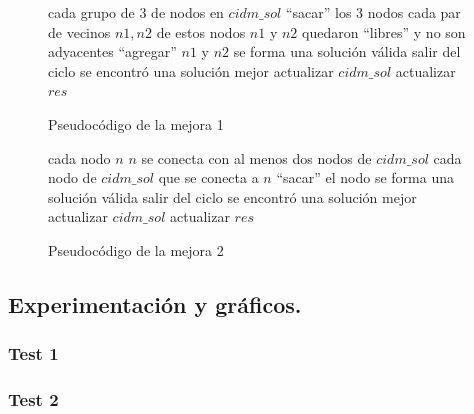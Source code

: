 \begin{figure}
\begin{codebox}
\li \For cada grupo de 3 de nodos en $cidm\_sol$
\li \Do 
		``sacar'' los 3 nodos
\li 		\For cada par de vecinos $n1,n2$ de estos nodos
\li 		\Do 
			\If $n1$ y $n2$ quedaron ``libres'' y no son adyacentes
\li			\Then
				``agregar'' $n1$ y $n2$
\li 				\If se forma una solución válida
\li 				\Then salir del ciclo
				\End
			\End
		\End
\li 		\If se encontró una solución mejor
\li 		\Then
			actualizar $cidm\_sol$
\li 			actualizar $res$
\li 			\Return
		\End
	\End
\li \Return
\end{codebox}
\caption{Pseudocódigo de la mejora 1}\label{code:mej1}
\end{figure}



\begin{figure}
\begin{codebox}
\li \For cada nodo $n$
\li \Do 
		\If $n$ se conecta con al menos dos nodos de $cidm\_sol$
\li 		\Then 
			\For cada nodo de $cidm\_sol$ que se conecta a $n$
\li 			\Do 
				``sacar'' el nodo
\li 				\If se forma una solución válida
\li 				\Then salir del ciclo
				\End
			\End
\li 			\If se encontró una solución mejor
\li 			\Then
				actualizar $cidm\_sol$
\li 				actualizar $res$
\li 				\Return
			\End
		\End
	\End
\li \Return
\end{codebox}
\caption{Pseudocódigo de la mejora 2}\label{code:mej2}
\end{figure}


\vspace*{0.6cm}
\subsection{Experimentación y gráficos.}

\vspace*{0.3cm}


\subsubsection{Test 1}
\vspace*{0.3cm}

\vspace*{0.6cm}

\subsubsection{Test 2}

